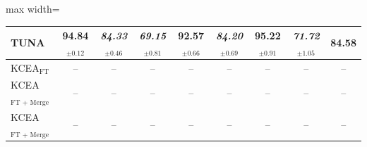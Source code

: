 \begin{table}[!t]
\begin{adjustbox}{max width=\textwidth}
\begin{tabular}{l c c c c c c c c}
TUNA & \textbf{94.84}$_{\pm 0.12}$ & \textit{84.33}$_{\pm 0.46}$ & \textit{69.15}$_{\pm 0.81}$ & \textbf{92.57}$_{\pm 0.66}$ & \textit{84.20}$_{\pm 0.69}$ & \textbf{95.22}$_{\pm 0.91}$ & \textit{71.72}$_{\pm 1.05}$ & \textbf{84.58} \\
\midrule
KCEA$_{\text{FT}}$ & -- & -- & -- & -- & -- & -- & -- & -- \\
KCEA$_{\text{FT + Merge}}$ & -- & -- & -- & -- & -- & -- & -- & -- \\
KCEA$_{\text{FT + Merge + Align}}$ & -- & -- & -- & -- & -- & -- & -- & -- \\
\bottomrule
\end{tabular}
\end{adjustbox}
\end{table}